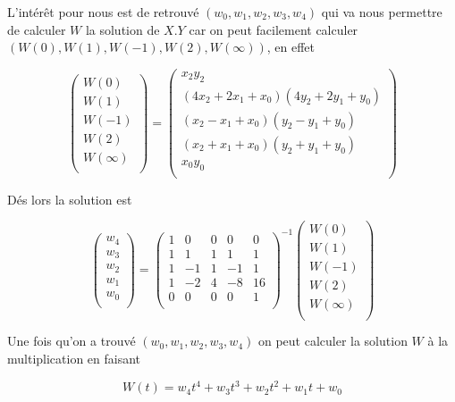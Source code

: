 \documentclass[letterpaper]{article}
\begin{document}
L'intérêt pour nous est de retrouvé $(w_0, w_1, w_2, w_3, w_4)$ qui va nous
permettre de calculer $W$ la solution de $X.Y$ car on peut facilement calculer
$(W(0), W(1), W(-1), W(2), W(\infty))$, en effet

$${\displaystyle
\begin{pmatrix}
  W(0) \\
  W(1) \\
  W(-1) \\
  W(2) \\
  W(\infty) \\
\end{pmatrix}
=
\begin{pmatrix}
  x_2y_2 \\
  (4x_2 + 2x_1 + x_0) (4y_2+ 2y_1 + y_0)\\
  (x_2 - x_1 + x_0) (y_2 - y_1 + y_0)\\
  (x_2 + x_1 + x_0) (y_2 + y_1 + y_0)\\
  x_0y_0\\
\end{pmatrix}
}$$

Dés lors la solution est

$$
\begin{pmatrix}
  w_4 \\
  w_3 \\
  w_2 \\
  w_1 \\
  w_0 \\
 \end{pmatrix}
=
\begin{pmatrix}
  1 & 0 & 0 & 0 & 0 \\
  1 & 1 & 1 & 1 & 1 \\
  1 &-1 & 1 &-1 & 1 \\
  1 &-2 & 4 &-8 &16 \\
  0 & 0 & 0 & 0 & 1 \\
\end{pmatrix}^{-1}
\begin{pmatrix}
  W(0) \\
  W(1) \\
  W(-1) \\
  W(2) \\
  W(\infty) \\
\end{pmatrix}
$$

Une fois qu'on a trouvé $(w_0, w_1, w_2, w_3, w_4)$ on peut calculer la
solution $W$ à la multiplication en faisant

  $$W(t) = w_4 t^4 + w_3 t^3 + w_2 t^2 + w_1 t + w_0$$
\end{document}
